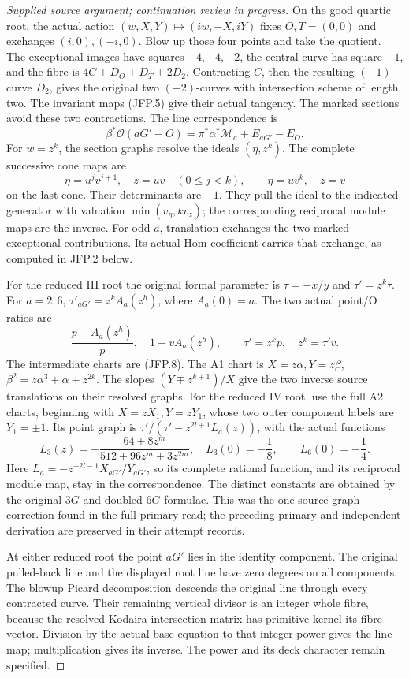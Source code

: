 \begin{proof}[Supplied source argument; continuation review in progress]
On the good quartic root, the actual action
\((w,X,Y)\mapsto(iw,-X,iY)\) fixes \(O,T=(0,0)\) and exchanges
\((i,0),(-i,0)\). Blow up those four points and take the quotient.
The exceptional images have squares \(-4,-4,-2\), the central
curve has square \(-1\), and the fibre is
\(4C+D_O+D_T+2D_2\). Contracting \(C\), then the resulting
\((-1)\)-curve \(D_2\), gives the original two \((-2)\)-curves
with intersection scheme of length two. The invariant maps (JFP.5)
give their actual tangency. The marked sections avoid these two
contractions. The line correspondence is
\[
 \beta^*\mathcal O(aG'-O)
 =\pi^*\alpha^*\mathcal M_a+E_{aG'}-E_O.
\tag{JFP.7}
\]
For \(w=z^k\), the section graphs resolve the ideals
\((\eta,z^k)\). The complete successive cone maps are
\[
 \eta=u^jv^{j+1},\quad z=uv\quad(0\le j<k),
 \qquad \eta=uv^k,\quad z=v
\tag{JFP.8}
\]
on the last cone. Their determinants are \(-1\). They pull the
ideal to the indicated generator with valuation
\(\min(v_\eta,k v_z)\); the corresponding reciprocal module maps
are the inverse. For odd \(a\), translation exchanges the two
marked exceptional contributions. Its actual Hom coefficient
carries that exchange, as computed in JFP.2 below.

For the reduced III root the original formal parameter is
\(\tau=-x/y\) and \(\tau'=z^k\tau\). For \(a=2,6\),
\(\tau'_{aG'}=z^kA_a(z^h)\), where \(A_a(0)=a\).
The two actual point/O ratios are
\[
 \frac{p-A_a(z^h)}p,\quad 1-vA_a(z^h),
 \qquad \tau'=z^kp,\quad z^k=\tau'v.
\tag{JFP.9}
\]
The intermediate charts are (JFP.8). The A1 chart is
\(X=z\alpha,Y=z\beta\),
\(\beta^2=z\alpha^3+\alpha+z^{2k}\). The slopes
\((Y\mp z^{k+1})/X\) give the two inverse source translations
on their resolved graphs. For the reduced IV root, use the full
A2 charts, beginning with \(X=zX_1,Y=zY_1\), whose two outer
component labels are \(Y_1=\pm1\). Its point graph is
\(\tau'/(\tau'-z^{2l+1}L_a(z))\), with the actual functions
\[
 L_3(z)=-\frac{64+8z^m}{512+96z^m+3z^{2m}},
 \quad L_3(0)=-\frac18,
 \qquad L_6(0)=-\frac14.
\tag{JFP.10}
\]
Here \(L_a=-z^{-2l-1}X_{aG'}/Y_{aG'}\), so its complete
rational function, and its reciprocal module map, stay in the
correspondence. The distinct constants are obtained by the original
\(3G\) and doubled \(6G\) formulae. This was the one source-graph
correction found in the full primary read; the preceding primary
and independent derivation are preserved in their attempt records.

At either reduced root the point \(aG'\) lies in the identity
component. The original pulled-back line and the displayed root
line have zero degrees on all components. The blowup Picard
decomposition descends the original line through every contracted
curve. Their remaining vertical divisor is an integer whole fibre,
because the resolved Kodaira intersection matrix has primitive
kernel its fibre vector. Division by the actual base equation to
that integer power gives the line map; multiplication gives its
inverse. The power and its deck character remain specified.


\end{proof}
